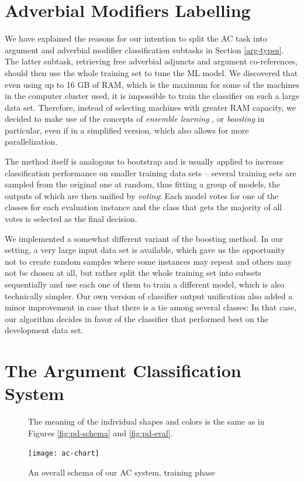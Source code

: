 \documentclass[12pt,notitlepage]{report}
\begin{document}
\section{Adverbial Modifiers Labelling}\label{ac-am}

We have explained the reasons for our intention to split the AC task into argument and adverbial modifier classification subtasks in Section \ref{arg-types}. The latter subtask, retrieving free adverbial adjuncts and argument co-references, should then use the whole training set to tune the ML model. We discovered that even using up to 16 GB of RAM, which is the maximum for some of the machines in the computer cluster used, it is impossible to train the classifier on such a large data set. Therefore, instead of selecting machines with greater RAM capacity, we decided to make use of the concepts of \emph{ensemble learning} \citep[p. 605ff.]{opitz99,hastie09}, or \emph{boosting} \citep[p. 321ff.]{witten05} in particular, even if in a simplified version, which also allows for more parallelization. 

The method itself is analogous to bootstrap and is usually applied to increase classification performance on smaller training data sets -- several training sets are sampled from the original one at random, thus fitting a group of models, the outputs of which are then unified by \emph{voting}: Each model votes for one of the classes for each evaluation instance and the class that gets the majority of all votes is selected as the final decision. 

We implemented a somewhat different variant of the boosting method. In our setting, a very large input data set is available, which gave us the opportunity not to create random samples where some instances may repeat and others may not be chosen at all, but rather split the whole training set into subsets sequentially and use each one of them to train a different model, which is also technically simpler. Our own version of classifier output unification also added a minor improvement in case that there is a tie among several classes: In that case, our algorithm decides in favor of the classifier that performed best on the development data set.

\section{The Argument Classification System}\label{ac-overview}

\begin{figure}[tbp]\footnotesize
\caption{An overall schema of our AC system, training phase}\label{fig:ac-schema}
\noindent The meaning of the individual shapes and colors is the same as in Figures \ref{fig:pd-schema} and \ref{fig:pd-eval}.
\begin{center}
\texttt{[image: ac-chart]}
\end{center}
\end{figure}
\end{document}
